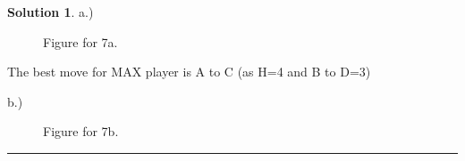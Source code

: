 \documentclass{article}
\theoremstyle{definition}
\def\fline{\rule{0.75\linewidth}{0.5pt}}
\newcommand{\finishline}{\begin{center}\fline\end{center}}
\newtheorem*{solution*}{Solution}
\newenvironment{solution}{\begin{solution*}}{{\finishline} \end{solution*}}
\begin{document}
\begin{solution}
	\item a.)
	\item \begin{figure}[h!]
			\centering
		 	\item 
			\caption{Figure for 7a.}
		\end{figure}
	\item The best move for MAX player is A to C (as H=4 and B to D=3)

	\item b.)
	\item \begin{figure}[h!]
			\centering
			\item 
		 	\caption{Figure for 7b.}
		\end{figure}
	

\end{solution}
\end{document}
